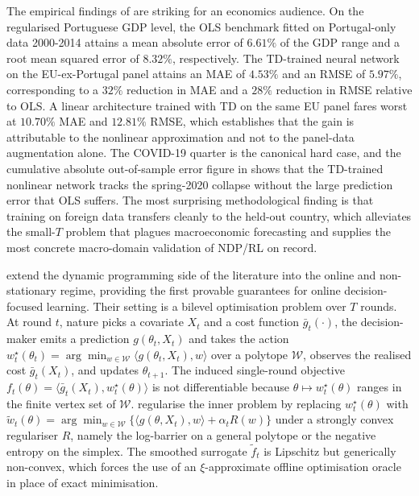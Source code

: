 The empirical findings of \citet{Fernandes2024} are striking for an economics
audience. On the regularised Portuguese GDP level, the OLS benchmark fitted on
Portugal-only data 2000-2014 attains a mean absolute error of $6.61\%$ of the
GDP range and a root mean squared error of $8.32\%$, respectively. The TD-trained
neural network on the EU-ex-Portugal panel attains an MAE of $4.53\%$ and an RMSE
of $5.97\%$, corresponding to a $32\%$ reduction in MAE and a $28\%$ reduction in
RMSE relative to OLS. A linear architecture trained with TD on the same EU panel
fares worst at $10.70\%$ MAE and $12.81\%$ RMSE, which establishes that the gain
is attributable to the nonlinear approximation and not to the panel-data
augmentation alone. The COVID-19 quarter is the canonical hard case, and the
cumulative absolute out-of-sample error figure in \citet{Fernandes2024} shows
that the TD-trained nonlinear network tracks the spring-2020 collapse without the
large prediction error that OLS suffers. The most surprising methodological
finding is that training on foreign data transfers cleanly to the held-out
country, which alleviates the small-$T$ problem that plagues macroeconomic
forecasting and supplies the most concrete macro-domain validation of NDP/RL on
record.

\citet{Capitaine2025} extend the dynamic programming side of the literature into
the online and non-stationary regime, providing the first provable guarantees for
online decision-focused learning. Their setting is a bilevel optimisation problem
over $T$ rounds. At round $t$, nature picks a covariate $X_t$ and a cost function
$\bar g_t(\cdot)$, the decision-maker emits a prediction $g(\theta_t, X_t)$ and
takes the action $w^\star_t(\theta_t) = \arg\min_{w \in \mathcal W}
\langle g(\theta_t, X_t), w \rangle$ over a polytope $\mathcal W$, observes the
realised cost $\bar g_t(X_t)$, and updates $\theta_{t+1}$. The induced
single-round objective $f_t(\theta) = \langle \bar g_t(X_t), w^\star_t(\theta)
\rangle$ is not differentiable because $\theta \mapsto w^\star_t(\theta)$ ranges
in the finite vertex set of $\mathcal W$. \citet{Capitaine2025} regularise the
inner problem by replacing $w^\star_t(\theta)$ with
$\widetilde w_t(\theta) = \arg\min_{w \in \mathcal W}
\{ \langle g(\theta, X_t), w \rangle + \alpha_t R(w) \}$
under a strongly convex regulariser $R$, namely the log-barrier on a general
polytope or the negative entropy on the simplex. The smoothed surrogate
$\widetilde f_t$ is Lipschitz but generically non-convex, which forces the use of
an $\xi$-approximate offline optimisation oracle in place of exact minimisation.

